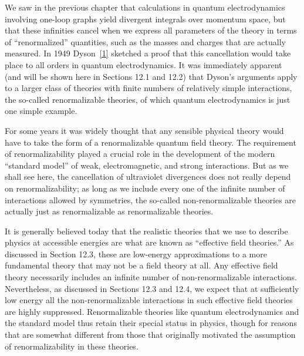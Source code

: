 
We saw in the previous chapter that calculations in quantum electrodynamics
involving one-loop graphs yield divergent integrals over momentum space, but
that these infinities cancel when we express all parameters of the theory in
terms of ``renormalized'' quantities, such as the masses and charges that are
actually measured. In 1949 Dyson~\hyperref[ref:12.1]{[1]} sketched a proof that
this cancellation would take place to all orders in quantum electrodynamics.
It was immediately apparent (and will be shown here in Sections 12.1 and 12.2)
that Dyson's arguments apply to a larger class of theories with finite numbers
of relatively simple interactions, the so-called renormalizable theories, of
which quantum electrodynamics is just one simple example.

For some years it was widely thought that any sensible physical theory would
have to take the form of a renormalizable quantum field theory. The requirement
of renormalizability played a crucial role in the development of the modern
``standard model'' of weak, electromagnetic, and strong interactions. But as
we shall see here, the cancellation of ultraviolet divergences does not really
depend on renormalizability; as long as we include every one of the infinite
number of interactions allowed by symmetries, the so-called non-renormalizable
theories are actually just as renormalizable as renormalizable theories.

It is generally believed today that the realistic theories that we use to
describe physics at accessible energies are what are known as ``effective
field theories.'' As discussed in Section 12.3, these are low-energy
approximations to a more fundamental theory that may not be a field theory at
all. Any effective field theory necessarily includes an infinite number of
non-renormalizable interactions. Nevertheless, as discussed in Sections 12.3
and 12.4, we expect that at sufficiently low energy all the non-renormalizable
interactions in such effective field theories are highly suppressed.
Renormalizable theories like quantum electrodynamics and the standard model
thus retain their special status in physics, though for reasons that are
somewhat different from those that originally motivated the assumption of
renormalizability in these theories.

